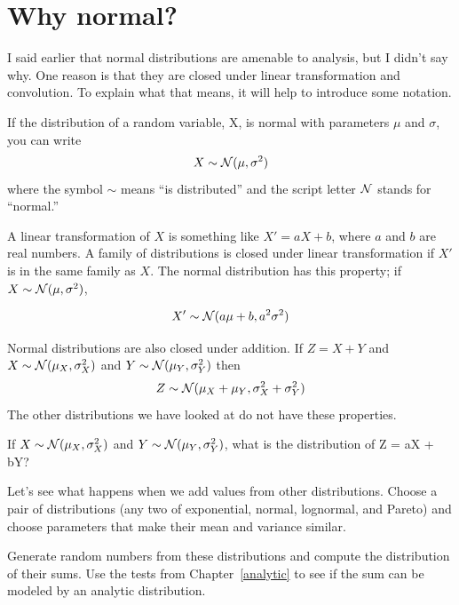 \documentclass[12pt]{book}
\begin{document}
\section{Why normal?}
\label{why_normal}

I said earlier that normal distributions are amenable to analysis,
but I didn't say why.  One reason is that they are
closed under linear transformation and convolution.  To explain what
that means, it will help to introduce some notation.

If the distribution of a random variable, X, is
normal with parameters $\mu$ and $\sigma$, you can write
%
\[ X \sim \mathcal{N} (\mu, \sigma^{2})\]
%
where the symbol $\sim$ means ``is distributed'' and the script letter
$\mathcal{N}$ stands for ``normal.''


A linear transformation of $X$ is something like $X' = a X + b$, where
$a$ and $b$ are real numbers.
A family of distributions is closed under
linear transformation if $X'$ is in the same family as $X$.  The normal
distribution has this property; if $X \sim \mathcal{N} (\mu,
\sigma^2)$,

\[ X' \sim \mathcal{N} (a \mu + b, a^{2} \sigma^2)\]

Normal distributions are also closed under addition.  
If $Z = X + Y$ and
$X \sim \mathcal{N} (\mu_{X}, \sigma_{X}^{2})$ and
$Y \sim \mathcal{N} (\mu_{Y}, \sigma_{Y}^{2})$ then
%
\[ Z \sim \mathcal{N} (\mu_X + \mu_Y, \sigma_X^2 + \sigma_Y^2) \]
%
The other distributions we have looked at do not have these
properties.

\begin{exercise}
If 
$X \sim \mathcal{N} (\mu_{X}, \sigma_{X}^{2})$ and
$Y \sim \mathcal{N} (\mu_{Y}, \sigma_{Y}^{2})$, what 
is the distribution of Z = aX + bY?

\end{exercise}

\begin{exercise}
Let's see what happens when we add values from
other distributions.  Choose a pair of distributions (any two of
exponential, normal, lognormal, and Pareto) and choose parameters
that make their mean and variance similar.

Generate random numbers from these distributions and compute the
distribution of their sums.  Use the tests from
Chapter~\ref{analytic} to see if the sum can be modeled by an
analytic distribution.

\end{exercise}
\end{document}

